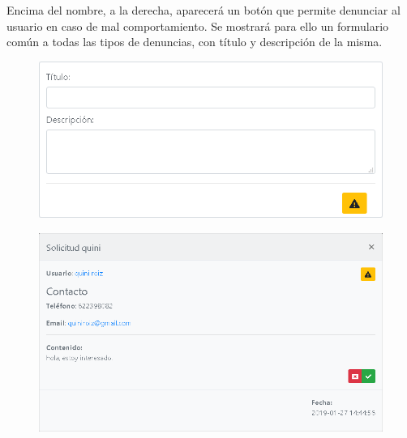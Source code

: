 Encima del nombre, a la derecha, aparecer\'{a} un bot\'{o}n que permite denunciar al usuario en caso de mal comportamiento. Se mostrar\'{a} para ello un formulario com\'{u}n a todas las tipos de denuncias, con t\'{i}tulo y descripci\'{o}n de la misma.

\begin{figure}[h!]
\centering
\includegraphics[width=.4\textwidth]{Img/ManualUsuario/DENUNCIA.png}
\end{figure}



\begin{figure}[h!]
\centering
\includegraphics[width=.4\textwidth]{Img/ManualUsuario/USER_REQUEST_READ.png}
\end{figure}

